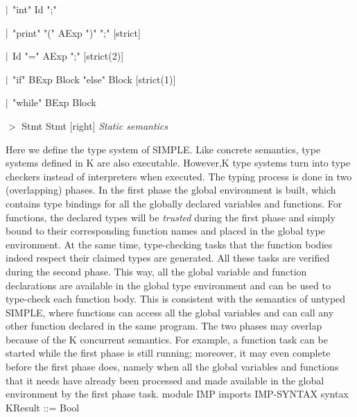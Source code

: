 \documentclass{article}
\begin{document}
\hspace{35pt} \qquad $\arrowvert$ "int" Id 
";"

 
\hspace{35pt} \qquad $\arrowvert$ 
"print"
"(" AExp ")"
";"
[strict]

 
\hspace{35pt} \qquad $\arrowvert$  Id 
"=" AExp 
";"
[strict(2)]

 
\hspace{35pt} \qquad $\arrowvert$ 
"if" BExp 
 Block 
"else" Block 
[strict(1)]

 
\hspace{35pt} \qquad $\arrowvert$ 
"while" BExp 
 Block 

\hspace{35pt} \qquad $>$  Stmt 
 Stmt 
[right]
\newline\newline
\textit{Static semantics}
\newline

\qquad Here we define the type system of SIMPLE. Like concrete semantics, type systems defined in K are also executable.  However,K type systems turn into type checkers instead of interpreters when executed. The typing process is done in two (overlapping) phases.  In the first phase the global environment is built, which contains type bindings for all the globally declared variables and functions.  For functions, the declared types will be \textit{trusted} during  the  first  phase  and  simply  bound  to  their  corresponding function names and placed in the global type environment.  At the same time, type-checking tasks that the function bodies indeed respect their claimed types are generated.  All these tasks are verified during the second phase.  This way, all the global variable and function declarations are available in the global type environment and can be used to type-check each function body.  This is consistent with the semantics of untyped SIMPLE, where functions can access all the global variables and can call any other function declared in the same program.  The two phases may overlap because of the K concurrent semantics. For example, a function task can be started while the first phase is still running; moreover, it may even complete before the first phase does, namely when all the global variables and functions that it needs have already been processed and made available in the global environment by the first phase task.\newline\newline
\newline 
 \newline 
module IMP
\newline
imports IMP-SYNTAX
\newline
\newline
\newline
\newline
syntax KResult ::=  Bool 
 
\end{document}
